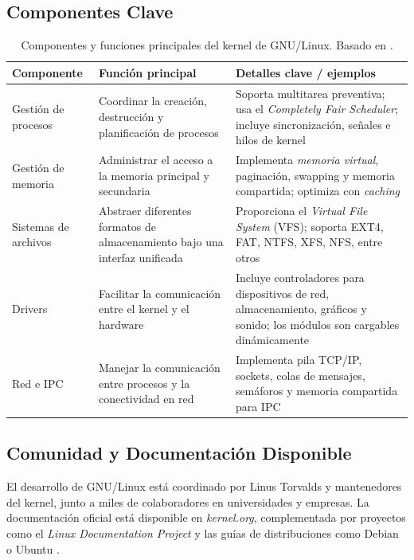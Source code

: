 \subsection{Componentes Clave}

\begin{table}[H]
\centering
\begin{tabular}{p{3.2cm}p{5cm}p{6cm}}
\hline
\textbf{Componente} & \textbf{Función principal} & \textbf{Detalles clave / ejemplos} \\
\hline
Gestión de procesos & Coordinar la creación, destrucción y planificación de procesos & Soporta multitarea preventiva; usa el \textit{Completely Fair Scheduler}; incluye sincronización, señales e hilos de kernel \\
\hline
Gestión de memoria & Administrar el acceso a la memoria principal y secundaria & Implementa \textit{memoria virtual}, paginación, swapping y memoria compartida; optimiza con \textit{caching} \\
\hline
Sistemas de archivos & Abstraer diferentes formatos de almacenamiento bajo una interfaz unificada & Proporciona el \textit{Virtual File System} (VFS); soporta EXT4, FAT, NTFS, XFS, NFS, entre otros \\
\hline
Drivers & Facilitar la comunicación entre el kernel y el hardware & Incluye controladores para dispositivos de red, almacenamiento, gráficos y sonido; los módulos son cargables dinámicamente \\
\hline
Red e IPC & Manejar la comunicación entre procesos y la conectividad en red & Implementa pila TCP/IP, sockets, colas de mensajes, semáforos y memoria compartida para IPC \\
\hline
\end{tabular}
\caption[Componentes y funciones clave del kernel de GNU/Linux]{Componentes y funciones principales del kernel de GNU/Linux. Basado en \textcite{tldp,kernel-docs}.}
\label{tab:componentes-gnu-linux}
\end{table}


\subsection{Comunidad y Documentación Disponible}
El desarrollo de GNU/Linux está coordinado por Linus Torvalds y mantenedores del kernel, 
junto a miles de colaboradores en universidades y empresas.  
La documentación oficial está disponible en \textit{kernel.org}, complementada por proyectos como el 
\textit{Linux Documentation Project} y las guías de distribuciones como Debian o Ubuntu \parencite{linux-foundation}.



